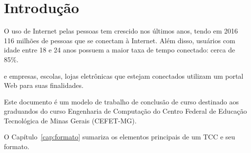 \chapter[Introdução]{Introdução}
\label{cap:introducao}



O uso de Internet pelas pessoas tem crescido nos últimos anos, tendo em 2016 116 milhões de pessoas que se conectam à Internet. Além disso, usuários com idade entre 18 e 24 anos possuem a maior taxa de tempo conectado: cerca de 85\%.\cite{ibge} 

e empresas, escolas, lojas eletrônicas que estejam conectados utilizam um portal Web para suas finalidades. 

Este documento é um modelo de trabalho de conclusão de curso destinado aos graduandos do curso Engenharia de Computação do Centro Federal de
Educação Tecnológica de Minas Gerais (CEFET-MG).



O Capítulo~\ref{cap:formato} sumariza os elementos principais de um TCC e seu formato.